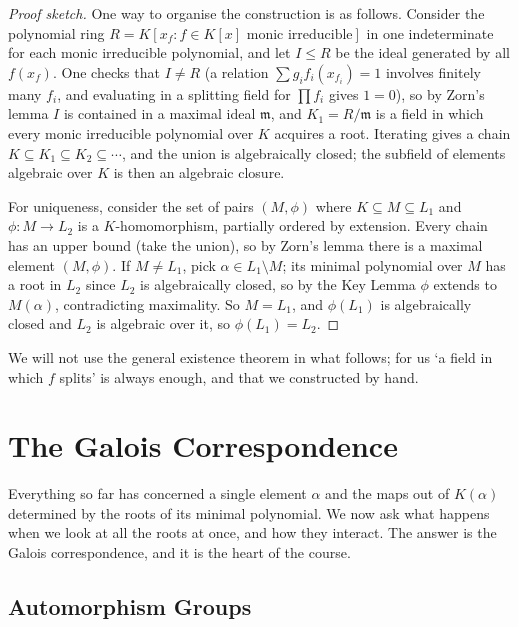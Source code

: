\begin{proof}[Proof sketch]
	One way to organise the construction is as follows. Consider the polynomial ring $R = K[x_f : f \in K[x] \text{ monic irreducible}]$ in one indeterminate for each monic irreducible polynomial, and let $I \leq R$ be the ideal generated by all $f(x_f)$. One checks that $I \neq R$ (a relation $\sum g_i f_i(x_{f_i}) = 1$ involves finitely many $f_i$, and evaluating in a splitting field for $\prod f_i$ gives $1 = 0$), so by Zorn's lemma $I$ is contained in a maximal ideal $\mathfrak m$, and $K_1 = R/\mathfrak m$ is a field in which every monic irreducible polynomial over $K$ acquires a root. Iterating gives a chain $K \subseteq K_1 \subseteq K_2 \subseteq \cdots$, and the union is algebraically closed; the subfield of elements algebraic over $K$ is then an algebraic closure.

	For uniqueness, consider the set of pairs $(M, \phi)$ where $K \subseteq M \subseteq L_1$ and $\phi : M \to L_2$ is a $K$-homomorphism, partially ordered by extension. Every chain has an upper bound (take the union), so by Zorn's lemma there is a maximal element $(M,\phi)$. If $M \neq L_1$, pick $\alpha \in L_1 \setminus M$; its minimal polynomial over $M$ has a root in $L_2$ since $L_2$ is algebraically closed, so by the Key Lemma $\phi$ extends to $M(\alpha)$, contradicting maximality. So $M = L_1$, and $\phi(L_1)$ is algebraically closed and $L_2$ is algebraic over it, so $\phi(L_1) = L_2$.
\end{proof}

We will not use the general existence theorem in what follows; for us `a field in which $f$ splits' is always enough, and that we constructed by hand.

\section{The Galois Correspondence}\label{sec:galois}

Everything so far has concerned a single element $\alpha$ and the maps out of $K(\alpha)$ determined by the roots of its minimal polynomial. We now ask what happens when we look at all the roots at once, and how they interact. The answer is the Galois correspondence, and it is the heart of the course.

\subsection{Automorphism Groups}

